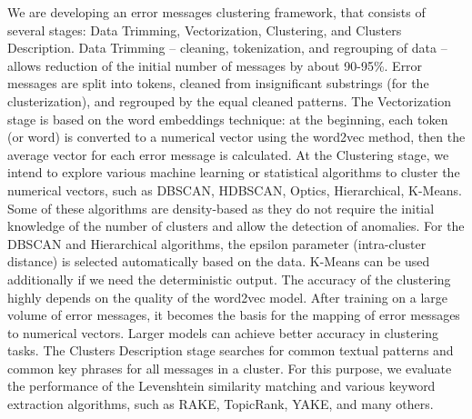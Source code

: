 We are developing an error messages clustering framework,
that consists of several stages: Data Trimming, Vectorization, Clustering, and Clusters Description. Data Trimming -- cleaning, tokenization, and regrouping of data -- allows reduction of the initial number of messages by about 90-95\%. Error messages are split into tokens, cleaned from insignificant substrings (for the clusterization), and regrouped by the equal cleaned patterns. 
The Vectorization stage is based on the word embeddings
technique: at the beginning, each token (or word) is converted to a numerical vector using the word2vec method, then the average vector for each error message is calculated. 
At the Clustering stage, we intend to explore various machine learning or statistical algorithms
to cluster the numerical vectors, such as DBSCAN, HDBSCAN, Optics, Hierarchical, K-Means. Some of these algorithms are density-based as they do not require the initial knowledge of the number of clusters and allow the detection of anomalies. For the DBSCAN and Hierarchical algorithms, the epsilon parameter (intra-cluster distance) is selected automatically based on the data. K-Means can be used additionally if we need the deterministic output. 
The accuracy of the clustering highly depends on the quality of the word2vec model. After training on a large volume of error messages, it becomes the basis for the mapping of error messages to numerical vectors. Larger models can achieve better accuracy in clustering tasks. 
The Clusters Description stage searches for common textual patterns and common key phrases for all messages in a cluster. For this purpose, we evaluate the performance of the Levenshtein similarity matching and various keyword extraction algorithms, such as RAKE, TopicRank, YAKE, and many others. 

